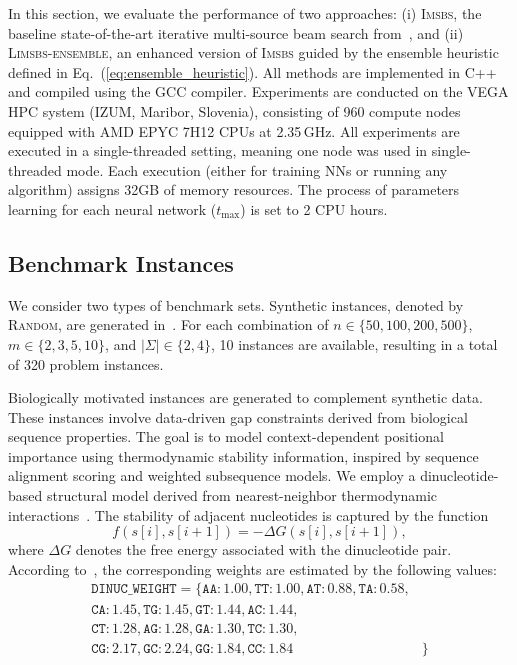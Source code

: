 \documentclass[runningheads]{llncs}
\begin{document}
In this section, we evaluate the performance of two approaches: 
(i) \textsc{Imsbs}, the baseline state-of-the-art iterative multi-source beam search from~\cite{djukanovic2026_eurocast}, and 
(ii) \textsc{Limsbs-ensemble}, an enhanced version of \textsc{Imsbs} guided by the ensemble heuristic defined in Eq.~(\ref{eq:ensemble_heuristic}). All methods are implemented in C++ and compiled using the GCC compiler. Experiments are conducted on the VEGA HPC system (IZUM, Maribor, Slovenia), consisting of 960 compute nodes equipped with AMD EPYC 7H12 CPUs at 2.35\,GHz. All experiments are executed in a single-threaded setting, meaning one node was used in single-threaded mode. Each execution (either for training NNs or running any algorithm) assigns  32GB of memory resources.
 The process of  parameters learning for each neural network ($t_{\max}$) is set to 2 CPU hours.

\subsection{Benchmark Instances}

We consider two types of benchmark sets. {Synthetic instances}, denoted by \textsc{Random}, are generated in~\cite{djukanovic2026_eurocast}. For each combination of $n \in \{50, 100, 200, 500\}$, $m \in \{2, 3, 5, 10\}$, and $|\Sigma| \in \{2, 4\}$, 10 instances are available, resulting in a total of 320 problem instances.

{Biologically motivated instances} are generated to
 complement synthetic data. These instances involve data-driven gap constraints derived from biological sequence properties. The goal is to model context-dependent positional importance using thermodynamic stability information, inspired by sequence alignment scoring and weighted subsequence models.  We employ a dinucleotide-based structural model derived from nearest-neighbor thermodynamic interactions~\cite{santalucia1998unified,watkins2005nearest}. The stability of adjacent nucleotides is captured by the function
\[
f(s[i], s[i+1]) = -\Delta G(s[i], s[i+1]),
\]
where $\Delta G$ denotes the free energy associated with the dinucleotide pair. According to~\cite{santalucia1998unified}, the corresponding weights are estimated by the following values:
\begin{align*}
\texttt{DINUC\_WEIGHT} = \{
\texttt{AA}:1.00, \texttt{TT}:1.00,
\texttt{AT}:0.88, \texttt{TA}:0.58,&\\ 
\texttt{CA}:1.45, \texttt{TG}:1.45,
\texttt{GT}:1.44, \texttt{AC}:1.44,&\\  
\texttt{CT}:1.28, \texttt{AG}:1.28,
\texttt{GA}:1.30, \texttt{TC}:1.30,&\\  
\texttt{CG}:2.17, \texttt{GC}:2.24,
\texttt{GG}:1.84, \texttt{CC}:1.84&\}
\end{align*}
\end{document}
